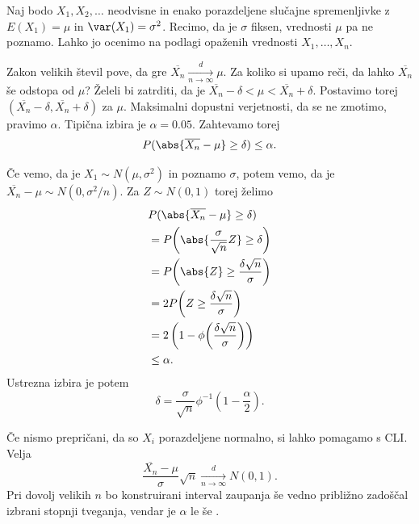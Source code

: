 

Naj bodo $X_1, X_2, \ldots$ neodvisne in enako porazdeljene slučajne
spremenljivke z $E(X_1) = \mu$ in $\var(X_1) = \sigma^2$.
Recimo, da je $\sigma$ fiksen, vrednosti $\mu$ pa ne poznamo.
Lahko jo ocenimo na podlagi opaženih vrednosti $X_1, \ldots, X_n$.

Zakon velikih števil pove, da gre $\overline{X_n} \xrightarrow[n \to \infty]{d}
\mu$.
Za koliko si upamo reči, da lahko $\overline{X_n}$ še odstopa od $\mu$?
Želeli bi zatrditi, da je $\overline{X_n} - \delta < \mu < \overline{X_n} +
\delta$.
Postavimo torej  $(\overline{X_n} - \delta,
\overline{X_n} + \delta)$ za $\mu$.
Maksimalni dopustni verjetnosti, da se ne zmotimo, pravimo  $\alpha$.
Tipična izbira je $\alpha = 0.05$.
Zahtevamo torej
\[
  P(\abs{\overline{X_n} - \mu} \ge \delta) \le \alpha.
\]

Če vemo, da je $X_1 \sim N(\mu, \sigma^2)$ in poznamo $\sigma$, potem vemo, da
je $\overline{X_n} - \mu \sim N(0, \sigma^2 / n)$.
Za $Z \sim N(0,1)$ torej želimo
\begin{align*}
  &P(\abs{\overline{X_n} - \mu} \ge \delta) \\
  &= P\!\left(\abs{\frac{\sigma}{\sqrt{n}} Z} \ge \delta\right) \\
  &= P\!\left(\abs{Z} \ge \frac{\delta \sqrt{n}}{\sigma}\right) \\
  &= 2 P\!\left(Z \ge \frac{\delta \sqrt{n}}{\sigma}\right) \\
  &= 2\left( 1 - \phi\!\left(\frac{\delta \sqrt{n}}{\sigma}\right) \right) \\
  &\le \alpha.
\end{align*}
Ustrezna izbira je potem
\[
  \delta = \frac{\sigma}{\sqrt{n}} \phi^{-1}\!\left(1 - \frac{\alpha}{2}\right).
\]


Če nismo prepričani, da so $X_i$ porazdeljene normalno, si lahko pomagamo s CLI.
Velja
\[
  \frac{\overline{X_n} - \mu}{\sigma} \sqrt{n} \xrightarrow[n \to \infty]{d}
  N(0,1).
\]
Pri dovolj velikih $n$ bo konstruirani interval zaupanja še vedno približno
zadoščal izbrani stopnji tveganja, vendar je $\alpha$ le še .


